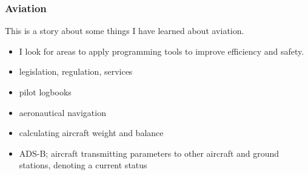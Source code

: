 \begin{frame}
\frametitle{Aviation}
\begin{block}{This is a story about some things I have learned about aviation.}
\begin{itemize}
\item<1-> \tiny{I look for areas to apply programming tools to improve efficiency and safety.}
\item<2-> \tiny{legislation, regulation, services}
\item<2-> \tiny{pilot logbooks}
\item<2-> \tiny{aeronautical navigation}
\item<2-> \tiny{calculating aircraft weight and balance}
\item<2-> \tiny{ADS-B; aircraft transmitting parameters to other aircraft and ground stations, denoting a current status}
\end{itemize}
\end{block}
\end{frame}
